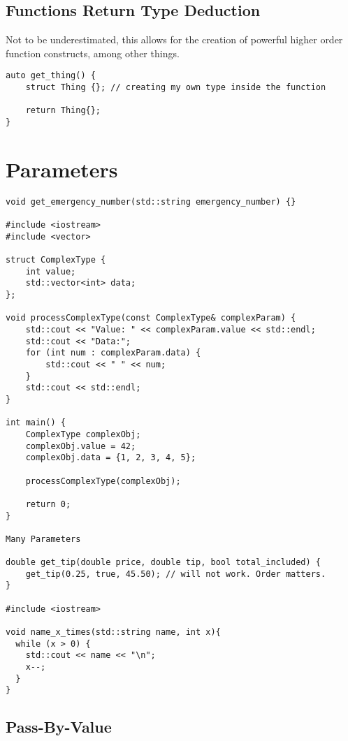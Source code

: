 \subsection{Functions Return Type Deduction}

Not to be underestimated, this allows
for the creation of powerful higher order function constructs, among other things.

\begin{verbatim}
auto get_thing() {
    struct Thing {}; // creating my own type inside the function 

    return Thing{};
}
\end{verbatim}

\section{Parameters}

\begin{verbatim}
void get_emergency_number(std::string emergency_number) {}

#include <iostream>
#include <vector>

struct ComplexType {
    int value;
    std::vector<int> data;
};

void processComplexType(const ComplexType& complexParam) {
    std::cout << "Value: " << complexParam.value << std::endl;
    std::cout << "Data:";
    for (int num : complexParam.data) {
        std::cout << " " << num;
    }
    std::cout << std::endl;
}

int main() {
    ComplexType complexObj;
    complexObj.value = 42;
    complexObj.data = {1, 2, 3, 4, 5};

    processComplexType(complexObj);

    return 0;
}

Many Parameters

double get_tip(double price, double tip, bool total_included) {
    get_tip(0.25, true, 45.50); // will not work. Order matters. 
}

#include <iostream>

void name_x_times(std::string name, int x){
  while (x > 0) {
    std::cout << name << "\n";
    x--;
  }
}
\end{verbatim}

\subsection{Pass-By-Value}

